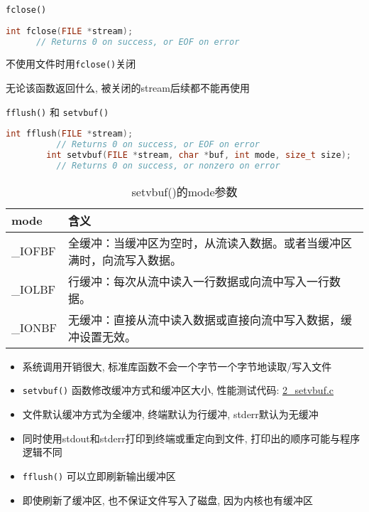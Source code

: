 \begin{frame}[fragile]{\texttt{fclose()}}
    \begin{lstlisting}[language=c]
    int fclose(FILE *stream);
      // Returns 0 on success, or EOF on error
    \end{lstlisting}
    不使用文件时用\texttt{fclose()}关闭

    无论该函数返回什么, 被关闭的stream后续都不能再使用
\end{frame}

\begin{frame}[fragile]{\texttt{fflush()} 和 \texttt{setvbuf()}}
    \scriptsize
    \begin{lstlisting}[language=c]
        int fflush(FILE *stream);
          // Returns 0 on success, or EOF on error
        int setvbuf(FILE *stream, char *buf, int mode, size_t size);
          // Returns 0 on success, or nonzero on error
    \end{lstlisting}
    \begin{table}[]
        \begin{tabular}{|l|l|}
            \hline
            mode & 含义 \\ \hline
            \_IOFBF & 全缓冲：当缓冲区为空时，从流读入数据。或者当缓冲区满时，向流写入数据。 \\ \hline
            \_IOLBF & 行缓冲：每次从流中读入一行数据或向流中写入一行数据。 \\ \hline
            \_IONBF & 无缓冲：直接从流中读入数据或直接向流中写入数据，缓冲设置无效。 \\ \hline
        \end{tabular}
        \caption{setvbuf()的mode参数}
    \end{table}
    \small
    \begin{itemize}[<+- | alert@+>]
        \item 系统调用开销很大, 标准库函数不会一个字节一个字节地读取/写入文件
        \item \texttt{setvbuf()} 函数修改缓冲方式和缓冲区大小, 性能测试代码: \href{http://problemoverflow.top/download/io.zip}{2\_setvbuf.c}
        \item 文件默认缓冲方式为全缓冲, 终端默认为行缓冲, stderr默认为无缓冲
        \item 同时使用stdout和stderr打印到终端或重定向到文件, 打印出的顺序可能与程序逻辑不同
        \item \texttt{fflush()} 可以立即刷新输出缓冲区
        \item 即使刷新了缓冲区, 也不保证文件写入了磁盘, 因为内核也有缓冲区
    \end{itemize}
\end{frame}

